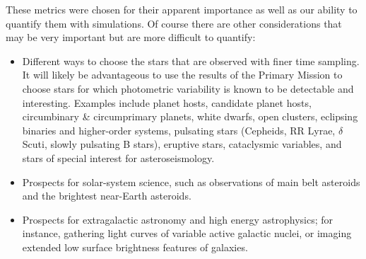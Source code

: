 These metrics were chosen for their apparent importance as well as our
ability to quantify them with simulations. Of course there are other considerations
that may be very important but are more difficult to quantify:
\begin{itemize}
\item Different ways to choose the stars that are observed with finer time sampling.
  It will likely be advantageous to use the results of the Primary Mission to
  choose stars for which photometric variability is known to be detectable and interesting.
  Examples include planet hosts, candidate planet hosts, circumbinary \&
  circumprimary planets, white dwarfs, open clusters, eclipsing binaries and higher-order systems,
  pulsating stars (Cepheids, RR Lyrae, $\delta$ Scuti, slowly pulsating B 
	stars), eruptive stars, cataclysmic variables, and stars of special interest for asteroseismology.
\item Prospects for solar-system science, such as observations of main belt asteroids and the brightest near-Earth asteroids.
\item Prospects for extragalactic astronomy and high energy astrophysics; for 
instance, gathering light curves of variable active galactic nuclei, or imaging
extended low surface brightness features of galaxies.
\end{itemize}

